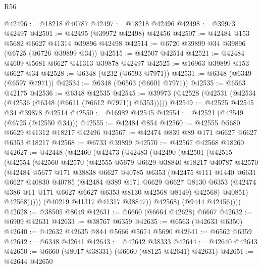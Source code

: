 \begin{lexlean}{R56}
\begin{coremodule}
@42496 := @18218 @40787
@42497 := @18218 @42496
@42498 := @39973 @42497
@42501 := @42495 (@39972 @42498) @42456
@42507 := @42484 @153 @5682 @6627 @41314 @39896 @42498
@42514 := @6720 @39899 @34 @39896 (@6725 (@6726 @39899 @34))
@42515 := @42507 @42514
@42521 := @42484 @4609 @5681 @6627 @41313 @39878 @42497
@42525 := @16963 @39899 @153 @6627 @34
@42528 := @6348 (@232 (@6593 @7971))
@42531 := @6348 (@6349 (@6597 @7971))
@42534 := @6348 (@6563 (@6601 @7971))
@42535 := @6563 @42175
@42536 := @6348 @42535
@42545 := @39973 (@42528 (@42531 (@42534 (@42536 (@6348 (@6611 (@6612 @7971)) @6353)))))
@42549 := @42525 @42545 @34 @39878 @42514
@42550 := @16982 @42545
@42554 := @42521 (@42549 (@6725 (@42550 @34)))
@42555 := @42484 @854
@42560 := @42555 @5680 @6629 @41312 @18217 @42496
@42567 := @42474 @839 @89 @171 @6627 @6627 @6353 @18217
@42568 := @6733 @39899
@42570 := @42567 @42568 @18260
@42627 := @42448
    (@42460
      (@42473
        (@42483
          (@42490
            (@42501
              (@42515
                (@42554
                  (@42560
                    @42570
                    (@42555
                      @5679
                      @6629
                      @38840
                      @18217
                      @40787
                      @42570
                      (@42484
                        @5677
                        @171
                        @38838
                        @6627
                        @40785
                        @6353
                        (@42475
                          @111
                          @1440
                          @6631
                          @6627
                          @40830
                          @40785
                          (@42484
                            @389
                            @171
                            @6629
                            @6627
                            @8130
                            @6353
                            (@42474 @386 @11 @171 @6627 @6627 @6353 @8130 @42568 @8149)
                            @42568)
                          @40851)
                        @42568)))))
              (@40219 @41317 @41317 @38847))
            @42568)
          (@9444 @42456))))
@42628 := @38505 @8049
@42631 := @6660 (@6664 @42628) @6667
@42632 := @6909 @42631
@42633 := @38767 @6359
@42635 := @6563 (@42633 @6350)
@42640 := @42632 @42635 @844 @5666 @5674 @5690
@42641 := @6562 @6359
@42642 := @6348 @42641
@42643 := @42642 @38333
@42644 := @42640 @42643
@42650 := @6660 (@8017 @38331) (@6660 (@8125 @42641) @42631)
@42651 := @42644 @42650

\end{coremodule}
\end{lexlean}
